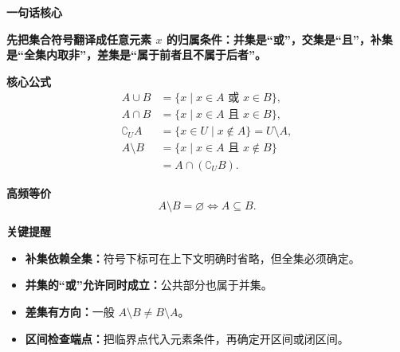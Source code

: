 \begin{summarybox}
	\textbf{\textcolor{CSummary}{一句话核心}}

	\textbf{先把集合符号翻译成任意元素 \(x\) 的归属条件：并集是“或”，交集是“且”，补集是“全集内取非”，差集是“属于前者且不属于后者”。}

	\medskip
	\textbf{\textcolor{CSummary}{核心公式}}
	\[
		\begin{aligned}
			A\cup B
			 & =\{x\mid x\in A\text{ 或 }x\in B\},   \\
			A\cap B
			 & =\{x\mid x\in A\text{ 且 }x\in B\},   \\
			\complement_U A
			 & =\{x\in U\mid x\notin A\}
			=U\setminus A,                          \\
			A\setminus B
			 & =\{x\mid x\in A\text{ 且 }x\notin B\} \\
			 & =A\cap(\complement_U B).
		\end{aligned}
	\]

	\medskip
	\textbf{\textcolor{CSummary}{高频等价}}
	\[
		A\setminus B=\varnothing\iff A\subseteq B.
	\]

	\medskip
	\textbf{\textcolor{CSummary}{关键提醒}}
	\begin{itemize}[leftmargin=*, itemsep=0.5em, topsep=0.4em]
		\item \textbf{补集依赖全集：}符号下标可在上下文明确时省略，但全集必须确定。
		\item \textbf{并集的“或”允许同时成立：}公共部分也属于并集。
		\item \textbf{差集有方向：}一般 \(A\setminus B\neq B\setminus A\)。
		\item \textbf{区间检查端点：}把临界点代入元素条件，再确定开区间或闭区间。
	\end{itemize}
\end{summarybox}